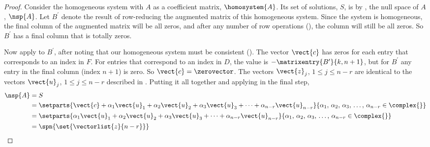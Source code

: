 %
\begin{proof}
Consider the homogeneous system with $A$ as a coefficient matrix, $\homosystem{A}$.  Its set of solutions, $S$, is by , the null space of $A$, $\nsp{A}$.  Let $B^{\prime}$ denote the result of row-reducing the augmented matrix of this homogeneous system.  Since the system is homogeneous, the final column of the augmented matrix will be all zeros, and after any number of row operations (), the column will still be all zeros.  So $B^{\prime}$ has a final column that is totally zeros.\par
%
Now apply  to $B^{\prime}$, after noting that our homogeneous system must be consistent ().  The vector $\vect{c}$ has zeros for each entry that corresponds to an index in $F$.  For entries that correspond to an index in $D$, the value is $-\matrixentry{B^{\prime}}{k,{n+1}}$, but for $B^{\prime}$ any entry in the final column (index $n+1$) is zero.  So $\vect{c}=\zerovector$.  The vectors $\vect{z}_j$, $1\leq j\leq n-r$ are identical to the vectors $\vect{u}_j$, $1\leq j\leq n-r$ described in .  Putting it all together and applying  in the final step,
%
\begin{align*}
\nsp{A}
&=S\\
%
&=\setparts{
\vect{c}+\alpha_1\vect{u}_1+\alpha_2\vect{u}_2+\alpha_3\vect{u}_3+\cdots+\alpha_{n-r}\vect{u}_{n-r}
}{
\alpha_1,\,\alpha_2,\,\alpha_3,\,\ldots,\,\alpha_{n-r}\in\complex{\null}
}\\
%
&=\setparts{
\alpha_1\vect{u}_1+\alpha_2\vect{u}_2+\alpha_3\vect{u}_3+\cdots+\alpha_{n-r}\vect{u}_{n-r}
}{
\alpha_1,\,\alpha_2,\,\alpha_3,\,\ldots,\,\alpha_{n-r}\in\complex{\null}
}\\
%
&=\spn{\set{\vectorlist{z}{n-r}}}
%
\end{align*}
%
\end{proof}
%
%
